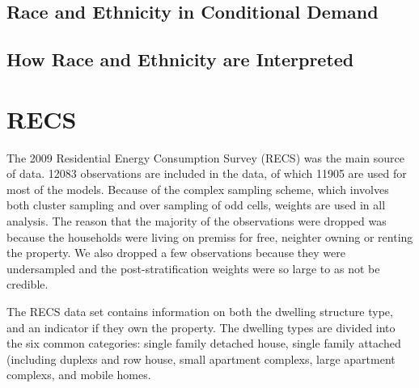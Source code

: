 \documentclass{article}
\begin{document}
% 





  \subsection{Race and Ethnicity in Conditional Demand}
  
  \subsection{How Race and Ethnicity are Interpreted}

\section{RECS}

The 2009 Residential Energy Consumption Survey (RECS) was the main source of data. 12083 observations are included in the data, of which 11905 are used for most of the models. Because of the complex sampling scheme, which involves both cluster sampling and over sampling of odd cells, weights are used in all analysis.  The reason that the majority of the observations were dropped was because the households were living on premiss for free, neighter owning or renting the property.  We also dropped a few observations because they were undersampled and the post-stratification weights  were so large to as not be credible.


The RECS data set contains information on both the dwelling structure type,  and an indicator if they own the property.  The dwelling types are divided into the six common categories: single family detached house, single family attached (including duplexs and row house, small apartment complexs, large apartment complexs, and mobile homes. 
\end{document}
